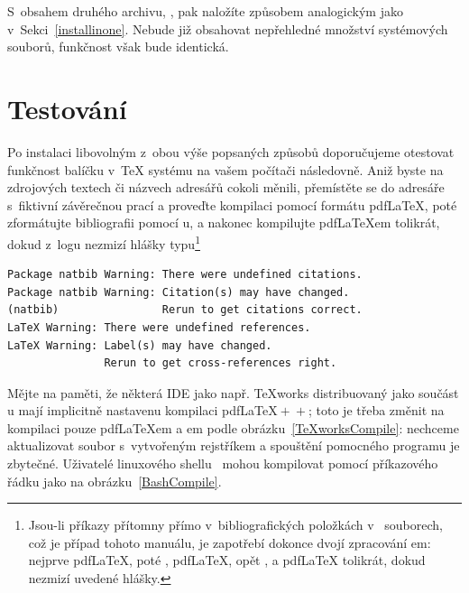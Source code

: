 S~obsahem druhého archivu, , pak naložíte způsobem
analogickým jako v~Sekci~\ref{installinone}. Nebude již obsahovat nepřehledné
množství systémových souborů, funkčnost však bude identická.

\section{Testování}\label{insttest}%

Po instalaci libovolným z~obou výše popsaných způsobů doporučujeme otestovat
funkčnost balíčku \pkg{\ipotname} v~\TeX{} systému na vašem počítači
následovně. Aniž byste na zdrojových textech či názvech adresářů cokoli
měnili, přemístěte se do adresáře s~fiktivní závěrečnou prací  a
proveďte kompilaci pomocí formátu pdf\LaTeX, poté zformátujte bibliografii
pomocí \BibTeX u, a nakonec kompilujte pdf\LaTeX em tolikrát, dokud z~logu
nezmizí hlášky typu\footnote{Jsou-li příkazy 
  přítomny přímo v~bibliografických položkách v~ souborech, což je
  případ tohoto manuálu, je zapotřebí dokonce dvojí zpracování \BibTeX em:
  nejprve pdf\LaTeX, poté \BibTeX, pdf\LaTeX, opět \BibTeX, a pdf\LaTeX{}
  tolikrát, dokud nezmizí uvedené hlášky.}

{\small
\begin{verbatim}
Package natbib Warning: There were undefined citations.
Package natbib Warning: Citation(s) may have changed.
(natbib)                Rerun to get citations correct.
LaTeX Warning: There were undefined references.
LaTeX Warning: Label(s) may have changed.
               Rerun to get cross-references right.
\end{verbatim}
\par}

Mějte na paměti, že některá IDE jako např. TeXworks distribuovaný jako součást
\distroMiKTeX u mají implicitně nastavenu kompilaci
pdf\LaTeX${}+{}$\MakeIndex${}+{}$\BibTeX; toto je třeba změnit na kompilaci
pouze pdf\LaTeX em a \BibTeX em podle obrázku~\ref{TeXworksCompile}: nechceme
aktualizovat soubor s~vytvořeným rejstříkem  a
spouštění pomocného programu \MakeIndex{} je zbytečné. Uživatelé linuxového
shellu~\cite{Sie:1999:LinuxNutshell:} mohou kompilovat pomocí příkazového
řádku jako na obrázku~\ref{BashCompile}.

